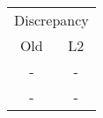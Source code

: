\begin{tabular}{cc}
\toprule
\multicolumn{2}{c}{Discrepancy} \\
Old &  L2 \\
\midrule
- & - \\
- & - \\
\bottomrule
\end{tabular}
